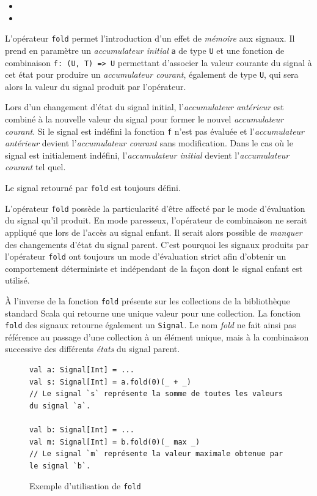 \begin{itemize}
	\item {}
	\item {}
\end{itemize}

L'opérateur \texttt{fold} permet l'introduction d'un effet de \emph{mémoire} aux signaux. Il prend en paramètre un \emph{accumulateur initial} \texttt{a} de type \texttt{U} et une fonction de combinaison \texttt{f: (U, T) => U} permettant d'associer la valeur courante du signal à cet état pour produire un \emph{accumulateur courant}, également de type \texttt{U}, qui sera alors la valeur du signal produit par l'opérateur.

Lors d'un changement d'état du signal initial, l'\emph{accumulateur antérieur} est combiné à la nouvelle valeur du signal pour former le nouvel \emph{accumulateur courant}. Si le signal est indéfini la fonction \texttt{f} n'est pas évaluée et l'\emph{accumulateur antérieur} devient l'\emph{accumulateur courant} sans modification. Dans le cas où le signal est initialement indéfini, l'\emph{accumulateur initial} devient l'\emph{accumulateur courant} tel quel.

Le signal retourné par \texttt{fold} est toujours défini.

L'opérateur \texttt{fold} possède la particularité d'être affecté par le mode d'évaluation du signal qu'il produit. En mode paresseux, l'opérateur de combinaison ne serait appliqué que lors de l'accès au signal enfant. Il serait alors possible de \emph{manquer} des changements d'état du signal parent. C'est pourquoi les signaux produits par l'opérateur \texttt{fold} ont toujours un mode d'évaluation strict afin d'obtenir un comportement déterministe et indépendant de la façon dont le signal enfant est utilisé.

À l'inverse de la fonction \texttt{fold} présente sur les collections de la bibliothèque standard Scala qui retourne une unique valeur pour une collection. La fonction \texttt{fold} des signaux retourne également un \texttt{Signal}. Le nom \emph{fold} ne fait ainsi pas référence au passage d'une collection à un élément unique, mais à la combinaison successive des différents \emph{états} du signal parent.

\begin{figure}[h]
	\begin{lstlisting}
val a: Signal[Int] = ...
val s: Signal[Int] = a.fold(0)(_ + _)
// Le signal `s` représente la somme de toutes les valeurs du signal `a`.

val b: Signal[Int] = ...
val m: Signal[Int] = b.fold(0)(_ max _)
// Le signal `m` représente la valeur maximale obtenue par le signal `b`.
	\end{lstlisting}
	\caption{Exemple d'utilisation de \texttt{fold}}
\end{figure}

